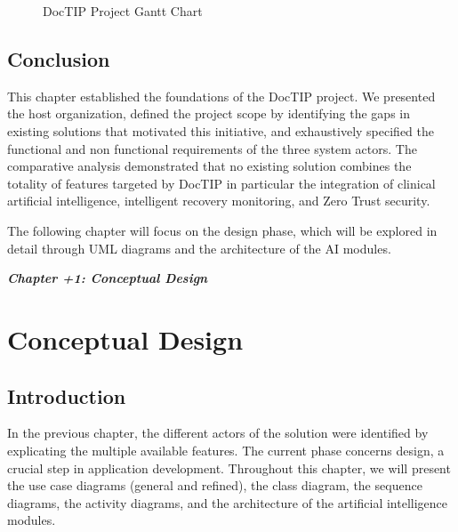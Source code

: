 \documentclass[12pt,a4paper,oneside]{report}
\newcommand{\chapterflyleaf}[1]{%
    \clearpage
    \thispagestyle{empty}
    \vspace*{\fill}
    \begin{center}
        {\bfseries\Huge\itshape Chapter \number\numexpr\value{chapter}+1\relax: #1}
    \end{center}
    \vspace*{\fill}
    \clearpage
}
\begin{document}
\begin{figure}[H]
    \centering
    \resizebox{\textwidth}{!}{}
    \caption{DocTIP Project Gantt Chart}
    \label{fig:gantt}
\end{figure}


\section*{Conclusion}
{}

This chapter established the foundations of the DocTIP project. We presented the host organization, defined the project scope by identifying the gaps in existing solutions that motivated this initiative, and exhaustively specified the functional and non functional requirements of the three system actors. The comparative analysis demonstrated that no existing solution combines the totality of features targeted by DocTIP in particular the integration of clinical artificial intelligence, intelligent recovery monitoring, and Zero Trust security.

The following chapter will focus on the design phase, which will be explored in detail through UML diagrams and the architecture of the AI modules.


\chapterflyleaf{Conceptual Design}
\chapter{Conceptual Design}

\section*{Introduction}
{}

In the previous chapter, the different actors of the solution were identified by explicating the multiple available features. The current phase concerns design, a crucial step in application development. Throughout this chapter, we will present the use case diagrams (general and refined), the class diagram, the sequence diagrams, the activity diagrams, and the architecture of the artificial intelligence modules.
\end{document}
